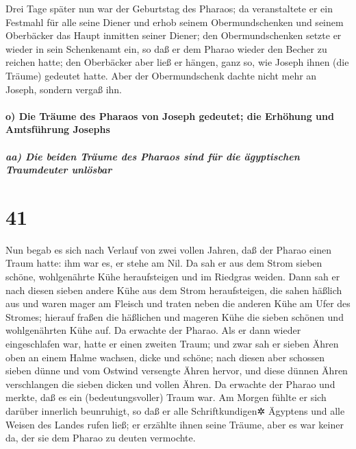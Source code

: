  Drei Tage später nun war der Geburtstag des Pharaos; da
veranstaltete er ein Festmahl für alle seine Diener und erhob seinem
Obermundschenken und seinem Oberbäcker das Haupt inmitten seiner Diener;
 den Obermundschenken setzte er wieder in sein
Schenkenamt ein, so daß er dem Pharao wieder den Becher zu reichen
hatte;  den Oberbäcker aber ließ er hängen, ganz so, wie
Joseph ihnen (die Träume) gedeutet hatte.  Aber der
Obermundschenk dachte nicht mehr an Joseph, sondern vergaß ihn.

\hypertarget{o-die-truxe4ume-des-pharaos-von-joseph-gedeutet-die-erhuxf6hung-und-amtsfuxfchrung-josephs}{%
\paragraph{o) Die Träume des Pharaos von Joseph gedeutet; die Erhöhung
und Amtsführung
Josephs}\label{o-die-truxe4ume-des-pharaos-von-joseph-gedeutet-die-erhuxf6hung-und-amtsfuxfchrung-josephs}}

\hypertarget{aa-die-beiden-truxe4ume-des-pharaos-sind-fuxfcr-die-uxe4gyptischen-traumdeuter-unluxf6sbar}{%
\subparagraph{aa) Die beiden Träume des Pharaos sind für die ägyptischen
Traumdeuter
unlösbar}\label{aa-die-beiden-truxe4ume-des-pharaos-sind-fuxfcr-die-uxe4gyptischen-traumdeuter-unluxf6sbar}}

\hypertarget{section-40}{%
\section{41}\label{section-40}}

 Nun begab es sich nach Verlauf von zwei vollen Jahren,
daß der Pharao einen Traum hatte: ihm war es, er stehe am Nil.
 Da sah er aus dem Strom sieben schöne, wohlgenährte Kühe
heraufsteigen und im Riedgras weiden.  Dann sah er nach
diesen sieben andere Kühe aus dem Strom heraufsteigen, die sahen häßlich
aus und waren mager am Fleisch und traten neben die anderen Kühe am Ufer
des Stromes;  hierauf fraßen die häßlichen und mageren
Kühe die sieben schönen und wohlgenährten Kühe auf. Da erwachte der
Pharao.  Als er dann wieder eingeschlafen war, hatte er
einen zweiten Traum; und zwar sah er sieben Ähren oben an einem Halme
wachsen, dicke und schöne;  nach diesen aber schossen
sieben dünne und vom Ostwind versengte Ähren hervor,  und
diese dünnen Ähren verschlangen die sieben dicken und vollen Ähren. Da
erwachte der Pharao und merkte, daß es ein (bedeutungsvoller) Traum war.
 Am Morgen fühlte er sich darüber innerlich beunruhigt, so
daß er alle Schriftkundigen✲ Ägyptens und alle Weisen des Landes rufen
ließ; er erzählte ihnen seine Träume, aber es war keiner da, der sie dem
Pharao zu deuten vermochte.

